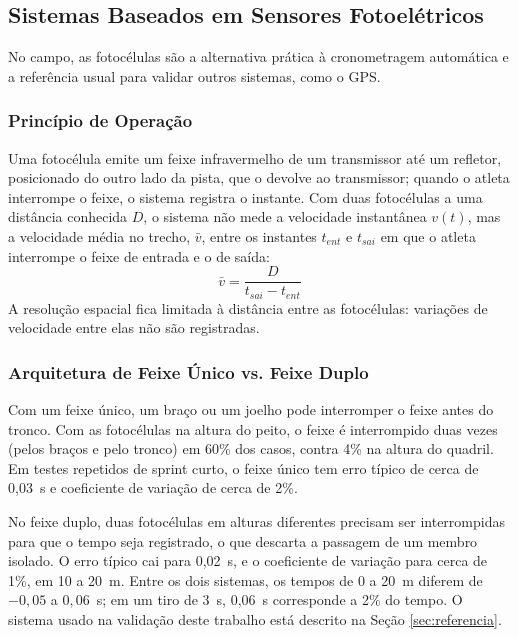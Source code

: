 \documentclass[
    12pt,               %
    openright,          %
    twoside,            %
    a4paper,            %
    chapter=TITLE,      %
    english,            %
    brazil              %
    ]{abntex2}
\begin{document}
\subsection{Sistemas Baseados em Sensores Fotoelétricos}
\label{sec:fotocelulas}

No campo, as fotocélulas são a alternativa prática à cronometragem automática e a referência usual para validar outros sistemas, como o GPS.

\subsubsection{Princípio de Operação}
Uma fotocélula emite um feixe infravermelho de um transmissor até um refletor, posicionado do outro lado da pista, que o devolve ao transmissor; quando o atleta interrompe o feixe, o sistema registra o instante. Com duas fotocélulas a uma distância conhecida $D$, o sistema não mede a velocidade instantânea $v(t)$, mas a velocidade média no trecho, $\bar{v}$, entre os instantes $t_{ent}$ e $t_{sai}$ em que o atleta interrompe o feixe de entrada e o de saída:
\begin{equation} \label{eq:vmedia}
    \bar{v} = \frac{D}{t_{sai} - t_{ent}}
\end{equation}
A resolução espacial fica limitada à distância entre as fotocélulas: variações de velocidade entre elas não são registradas.

\subsubsection{Arquitetura de Feixe Único vs. Feixe Duplo}
Com um feixe único, um braço ou um joelho pode interromper o feixe antes do tronco. Com as fotocélulas na altura do peito, o feixe é interrompido duas vezes (pelos braços e pelo tronco) em 60\% dos casos, contra 4\% na altura do quadril. Em testes repetidos de sprint curto, o feixe único tem erro típico de cerca de 0,03~s e coeficiente de variação de cerca de 2\%.

No feixe duplo, duas fotocélulas em alturas diferentes precisam ser interrompidas para que o tempo seja registrado, o que descarta a passagem de um membro isolado. O erro típico cai para 0,02~s, e o coeficiente de variação para cerca de 1\%, em 10 a 20~m. Entre os dois sistemas, os tempos de 0 a 20~m diferem de $-0{,}05$ a $0{,}06$~s; em um tiro de 3~s, 0,06~s corresponde a 2\% do tempo. O sistema usado na validação deste trabalho está descrito na Seção \ref{sec:referencia}.
\end{document}
